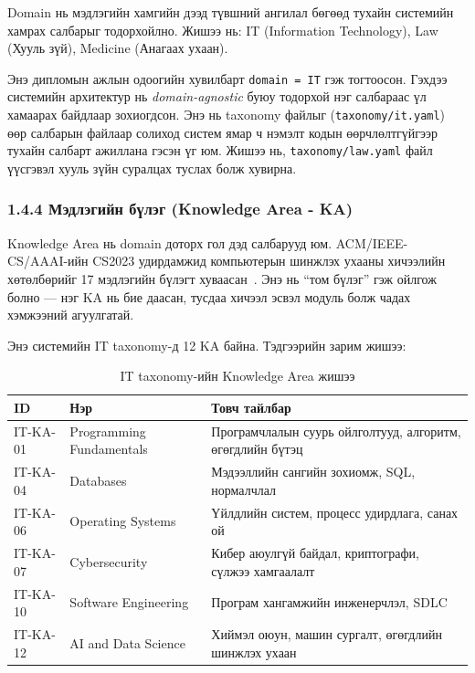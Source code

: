 \documentclass[12pt,A4]{report}
\newcommand{\eng}[1]{#1}
\newcommand{\term}[1]{\textit{#1}}
\begin{document}
\eng{Domain} нь мэдлэгийн хамгийн дээд түвшний ангилал бөгөөд тухайн системийн хамрах салбарыг тодорхойлно. Жишээ нь: IT (\eng{Information Technology}), Law (Хууль зүй), Medicine (Анагаах ухаан).

Энэ дипломын ажлын одоогийн хувилбарт \texttt{domain = IT} гэж тогтоосон. Гэхдээ системийн архитектур нь \term{\eng{domain-agnostic}} буюу тодорхой нэг салбараас үл хамаарах байдлаар зохиогдсон. Энэ нь \eng{taxonomy} файлыг (\texttt{taxonomy/it.yaml}) өөр салбарын файлаар солиход систем ямар ч нэмэлт кодын өөрчлөлтгүйгээр тухайн салбарт ажиллана гэсэн үг юм. Жишээ нь, \texttt{taxonomy/law.yaml} файл үүсгэвэл хууль зүйн суралцах туслах болж хувирна.

\subsubsection{1.4.4 Мэдлэгийн бүлэг (\eng{Knowledge Area} - KA) }

\eng{Knowledge Area} нь \eng{domain} доторх гол дэд салбарууд юм. ACM/IEEE-CS/AAAI-ийн CS2023 удирдамжид компьютерын шинжлэх ухааны хичээлийн хөтөлбөрийг 17 мэдлэгийн бүлэгт хуваасан~\cite{cs2023}. Энэ нь ``том бүлэг'' гэж ойлгож болно --- нэг KA нь бие даасан, тусдаа хичээл эсвэл модуль болж чадах хэмжээний агуулгатай.

Энэ системийн IT \eng{taxonomy}-д 12 KA байна. Тэдгээрийн зарим жишээ:

\begin{table}[h!]
\centering
\caption{IT \eng{taxonomy}-ийн Knowledge Area жишээ}
\label{tab:ka_examples}
\begin{tabularx}{\textwidth}{>{\ttfamily}l l X}
\toprule
\textbf{ID} & \textbf{Нэр} & \textbf{Товч тайлбар} \\
\midrule
\rowcolor{lightbg}
IT-KA-01 & \eng{Programming Fundamentals} & Програмчлалын суурь ойлголтууд, алгоритм, өгөгдлийн бүтэц \\
IT-KA-04 & \eng{Databases} & Мэдээллийн сангийн зохиомж, SQL, нормалчлал \\
\rowcolor{lightbg}
IT-KA-06 & \eng{Operating Systems} & Үйлдлийн систем, процесс удирдлага, санах ой \\
IT-KA-07 & \eng{Cybersecurity} & Кибер аюулгүй байдал, криптографи, сүлжээ хамгаалалт \\
\rowcolor{lightbg}
IT-KA-10 & \eng{Software Engineering} & Програм хангамжийн инженерчлэл, SDLC \\
IT-KA-12 & \eng{AI and Data Science} & Хиймэл оюун, машин сургалт, өгөгдлийн шинжлэх ухаан \\
\bottomrule
\end{tabularx}
\end{table}
\end{document}

